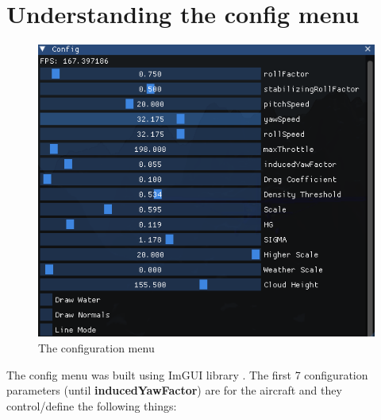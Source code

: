 \section{Understanding the config menu}

\begin{figure}[H]
	\centering
	\includegraphics[width=1.0\textwidth,height=0.5\textheight,frame]{images/figure3.png}
	\caption{The configuration menu}
	\label{fig:config_menu}
\end{figure}

The config menu was built using ImGUI library \cite{omar_imgui}. The first 7 configuration parameters (until \textbf{inducedYawFactor}) are for the aircraft and they control/define the following things:


